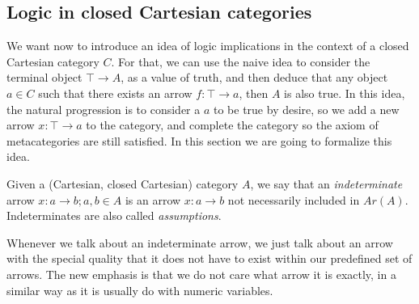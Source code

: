 \subsection{Logic in closed Cartesian categories}

We want now to introduce an idea of logic implications in the context of a closed Cartesian category $C$. For that, we can use the naive idea to consider the terminal object $\top \to A$, as a value of truth, and then deduce that any object $a\in C$ such that there exists an arrow $f:\top \to a$, then $A$ is also true. In this idea, the natural progression is to consider a $a$ to be true by desire, so we add a new arrow $x:\top \to a$ to the category, and complete the category so the axiom of metacategories are still satisfied. In this section we are going to formalize this idea.
\begin{definition}
  Given a (Cartesian, closed Cartesian) category $A$, we say that an \emph{indeterminate} arrow $x: a \to b; a,b \in A$ is an arrow $x:a \to b$  not necessarily included in $Ar(A)$. Indeterminates are also called \emph{assumptions}.
\end{definition}
\begin{remark}\label{remark-indeterminates}
  Whenever we talk about an indeterminate arrow, we just talk about an arrow with the special quality that it does not have to exist within our predefined set of arrows. The new emphasis is that we do not care what arrow it is exactly, in a similar way as it is usually do with numeric variables. 
\end{remark}

